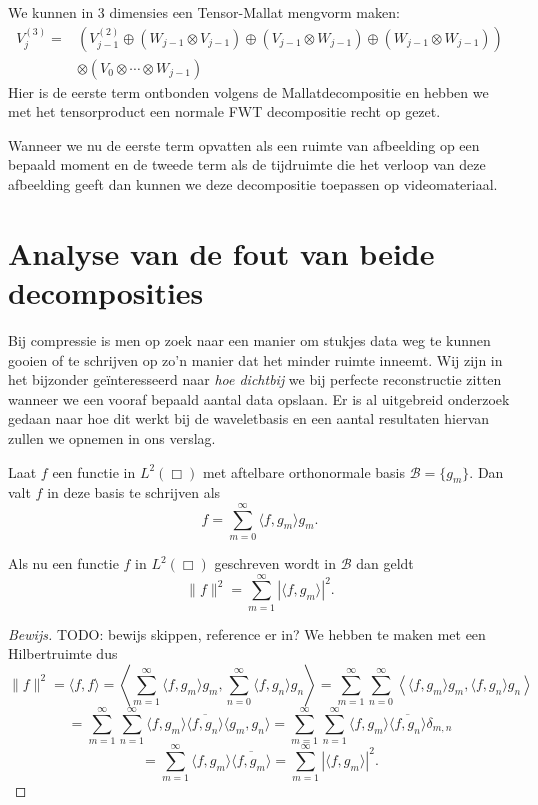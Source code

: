 \begin{voorbeeld}
We kunnen in 3 dimensies een Tensor-Mallat mengvorm maken:
\begin{equation}
\label{3d_mengvorm}
\begin{split}
V_j^{(3)} = &
\left (V^{(2)}_{j-1} 
\oplus (W_{j-1}\otimes V_{j-1}) 
\oplus (V_{j-1}\otimes W_{j-1}) 
\oplus (W_{j-1}\otimes W_{j-1}) \right ) \\
&\otimes (V_0\otimes\cdots\otimes W_{j-1})
\end{split}
\end{equation}
Hier is de eerste term ontbonden volgens de Mallatdecompositie en hebben we met het tensorproduct
een normale FWT decompositie recht op gezet.
\end{voorbeeld}
\begin{gevolg}
Wanneer we nu de eerste term opvatten als een ruimte van afbeelding op een bepaald moment en
de tweede term als de tijdruimte die het verloop van deze afbeelding geeft dan kunnen we deze
decompositie toepassen op videomateriaal. 
\end{gevolg}

\section{Analyse van de fout van beide decomposities}

Bij compressie is men op zoek naar een manier om stukjes data weg te kunnen gooien of te schrijven op zo'n manier dat het minder ruimte inneemt. Wij zijn in het bijzonder ge\"interesseerd naar \emph{hoe dichtbij} we bij perfecte reconstructie zitten wanneer we een vooraf bepaald aantal data opslaan. Er is al uitgebreid onderzoek gedaan naar hoe dit werkt bij de waveletbasis en een aantal resultaten hiervan zullen we opnemen in ons verslag.

Laat $f$ een functie in $L^2(\Box)$ met aftelbare orthonormale basis $\mathcal{B} = \{ g_m \}$. Dan valt $f$ in deze basis te schrijven als
\[
f = \sum_{m = 0}^\infty \langle f, g_m \rangle g_m.
\]

\begin{lemm}
  Als nu een functie $f$ in $L^2(\Box)$ geschreven wordt in $\mathcal{B}$ dan geldt
  \[
  \|f\|^2 = \sum_{m=1}^\infty | \langle f, g_m \rangle |^2.
  \]
\end{lemm}
\begin{proof}[Bewijs]
  TODO: bewijs skippen, reference er in?
  We hebben te maken met een Hilbertruimte dus
  \[
  \|f\|^2 = \langle f, f \rangle = \left\langle \sum_{m=1}^\infty \langle f, g_m \rangle g_m, \sum_{n=0}^\infty \langle f, g_n \rangle g_n \right\rangle = \sum_{m=1}^\infty \sum_{n=0}^\infty \left\langle \langle f, g_m \rangle g_m, \langle f, g_n \rangle g_n \right \rangle
  \]
  \[
  = \sum_{m=1}^\infty \sum_{n=1}^\infty \langle f, g_m \rangle \overline{\langle f, g_n \rangle}\langle g_m, g_n \rangle = \sum_{m=1}^\infty \sum_{n=1}^\infty \langle f, g_m \rangle \overline{\langle f, g_n \rangle} \delta_{m,n}
  \]
  \[ = \sum_{m=1}^\infty \langle f, g_m \rangle \overline{\langle f, g_m \rangle} = \sum_{m=1}^\infty |\langle f, g_m \rangle |^2.
  \]
\end{proof}

